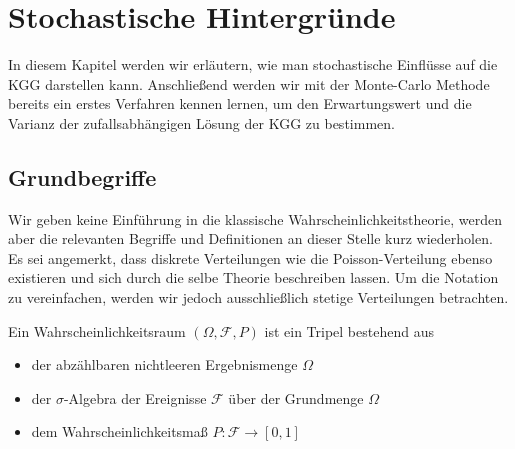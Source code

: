 
\chapter{Stochastische Hintergründe}
In diesem Kapitel werden wir erläutern, wie man stochastische Einflüsse auf die KGG darstellen kann. Anschließend werden wir mit der Monte-Carlo Methode bereits ein erstes Verfahren kennen lernen, um den Erwartungswert und die Varianz der zufallsabhängigen Lösung der KGG zu bestimmen.


\section{Grundbegriffe}
Wir geben keine Einführung in die klassische Wahrscheinlichkeitstheorie, werden aber die relevanten Begriffe und Definitionen an dieser Stelle kurz wiederholen. Es sei angemerkt, dass diskrete Verteilungen wie die Poisson-Verteilung ebenso existieren und sich durch die selbe Theorie beschreiben lassen. Um die Notation zu vereinfachen, werden wir jedoch ausschließlich stetige Verteilungen betrachten.

\begin{mathdef}[Wahrscheinlichkeitsraum]
Ein Wahrscheinlichkeitsraum $(\Omega,\mathcal{F},P)$ ist ein Tripel bestehend aus 
\begin{itemize}
\item der abzählbaren nichtleeren Ergebnismenge $\Omega$
\item der $\sigma$-Algebra der Ereignisse $\mathcal{F}$ über der Grundmenge $\Omega$
\item dem Wahrscheinlichkeitsmaß $P\colon\mathcal{F}\to [0,1]$
\end{itemize}
\end{mathdef}

